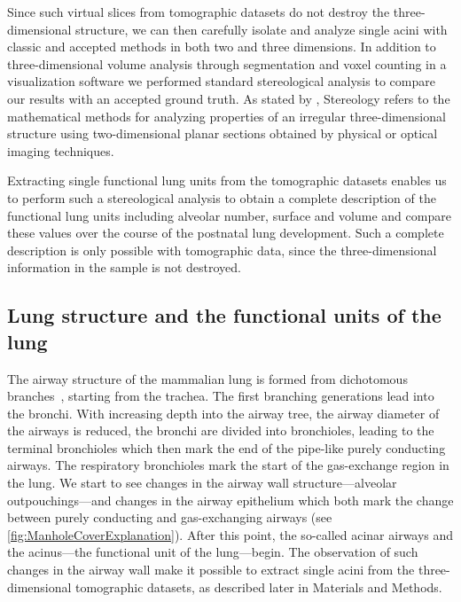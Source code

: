 \documentclass[%
	draft,
	paper=a4,%
	abstract=true,%
	]{scrartcl}
\begin{document}
Since such virtual slices from tomographic datasets do not destroy the three-dimensional structure, we can then carefully isolate and analyze single acini with classic and accepted methods in both two and three dimensions. In addition to three-dimensional volume analysis through segmentation and voxel counting in a visualization software we performed standard stereological analysis \cite{Hsia2010} to compare our results with an accepted ground truth. As stated by \citet{Hsia2010}, Stereology refers to the mathematical methods for analyzing properties of an irregular three-dimensional structure using two-dimensional planar sections obtained by physical or optical imaging techniques.

Extracting single functional lung units from the tomographic datasets enables us to perform such a stereological analysis to obtain a complete description of the functional lung units including alveolar number, surface and volume and compare these values over the course of the postnatal lung development. Such a complete description  is only possible with tomographic data, since the three-dimensional information in the sample is not destroyed.

\subsection{Lung structure and the functional units of the lung}
The airway structure of the mammalian lung is formed from dichotomous branches~\cite{Weibel1991}, starting from the trachea. The first branching generations lead into the bronchi. With increasing depth into the airway tree, the airway diameter of the airways is reduced, the bronchi are divided into bronchioles, leading to the terminal bronchioles which then mark the end of the pipe-like purely conducting airways. The respiratory bronchioles mark the start of the gas-exchange region in the lung. We start to see changes in the airway wall structure---alveolar outpouchings---and changes in the airway epithelium which both mark the change between purely conducting and gas-exchanging airways (see \autoref{fig:ManholeCoverExplanation}). After this point, the so-called acinar airways and the acinus---the functional unit of the lung---begin. The observation of such changes in the airway wall make it possible to extract single acini from the three-dimensional tomographic datasets, as described later in Materials and Methods.
\end{document}

